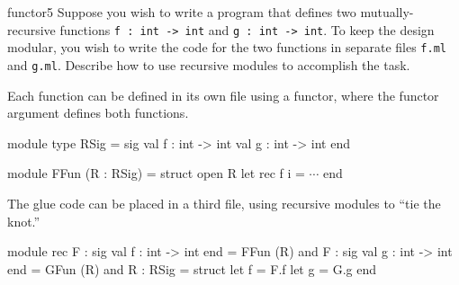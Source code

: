 %
%
\begin{exercise}{functor5}
Suppose you wish to write a program that defines two
mutually-recursive functions \hbox{\lstinline$f : int -> int$}
and \hbox{\lstinline$g : int -> int$}.  To keep the design modular,
you wish to write the code for the two functions in separate
files \hbox{\lstinline$f.ml$} and \hbox{\lstinline$g.ml$}.  Describe
how to use recursive modules to accomplish the task.

\begin{answer}\ifanswers
Each function can be defined in its own file using a functor, where the
functor argument defines both functions.

\begin{ocaml}
module type RSig = sig
   val f : int -> int
   val g : int -> int
end

module FFun (R : RSig) = struct
   open R
   let rec f i = $\cdots$
end
\end{ocaml}
%
The glue code can be placed in a third file, using recursive modules
to ``tie the knot.''

\begin{ocaml}
module rec F : sig val f : int -> int end = FFun (R)
and F : sig val g : int -> int end = GFun (R)
and R : RSig = struct
   let f = F.f
   let g = G.g
end
\end{ocaml}
\fi\end{answer}
\end{exercise}

